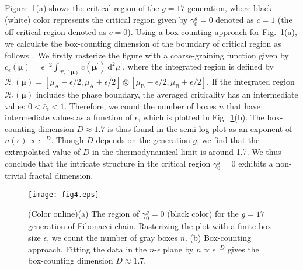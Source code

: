 \documentclass[%
superscriptaddress,
preprint,
amsmath,amssymb,
]{revtex4-1}
\newcommand{\mrm}{\mathrm}
\newcommand{\mcl}{\mathcal}
\newcommand{\der}{\mrm{d}}
\begin{document}
Figure~\ref{fig:tpd}(a) shows the critical region of the $g=17$ generation, where black (white) color represents the critical region given by $\gamma_0^g=0$ denoted as $c=1$ (the off-critical region denoted as $c=0$). 
Using a box-counting approach for Fig.~\ref{fig:tpd}(a), we calculate the box-counting dimension of the boundary of critical region as follows~\cite{Mandelbrot77}.
We firstly rasterize the figure with a coarse-graining function given by $\bar{c}_\epsilon(\bm{\mu})=\epsilon^{-2}\int_{\mcl{R}_{\epsilon}(\bm{\mu})} c(\bm{\mu}^\prime) \,\der^2\mu^\prime$, where the integrated region is defined by $\mcl{R}_\epsilon(\bm{\mu})=[\mu_{\mrm{A}}-\epsilon/2,\mu_{\mrm{A}}+\epsilon/2]\otimes[\mu_{\mrm{B}}-\epsilon/2,\mu_{\mrm{B}}+\epsilon/2]$.
If the integrated region $\mcl{R}_\epsilon(\bm{\mu})$ includes the phase boundary, the averaged criticality has an intermediate value: $0<\bar{c}_\epsilon<1$.
Therefore, we count the number of boxes $n$ that have intermediate values as a function of $\epsilon$, which is plotted in Fig.~\ref{fig:tpd}(b). 
The box-counting dimension $D\approx 1.7$ is thus found in the semi-log plot as an exponent of $n(\epsilon)\propto \epsilon^{-D}$.
Though $D$ depends on the generation $g$, we find that the extrapolated value of $D$ in the thermodynamical limit is around 1.7.
We thus conclude that the intricate structure in the critical region $\gamma_0^g=0$ exhibits a non-trivial fractal dimension.


\begin{figure}[t]
	\centering
	\texttt{[image: fig4.eps]}
	\caption{(Color online)(a) The region of $\gamma_0^g=0$ (black color) for the $g=17$ generation of Fibonacci chain. Rasterizing the plot with a finite box size $\epsilon$, we count the number of gray boxes $n$.
		(b) Box-counting approach. Fitting the data in the $n$-$\epsilon$ plane by $n\propto \epsilon^{-D}$ gives the box-counting dimension $D\approx 1.7$.}
	\label{fig:tpd}
\end{figure}
\end{document}
